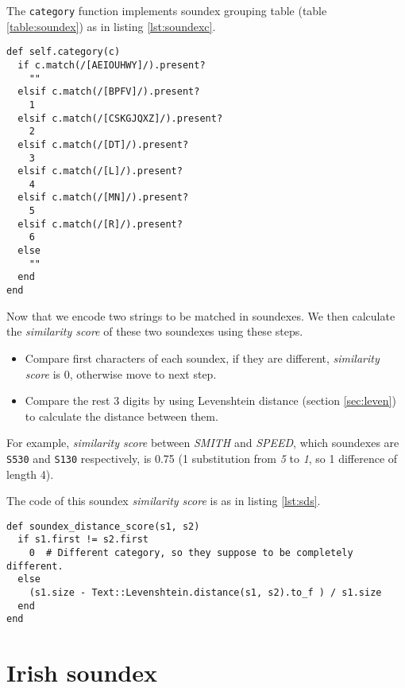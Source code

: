 The \texttt{category} function implements soundex grouping table (table \ref{table:soundex})
as in listing \ref{lst:soundexc}.

\begin{minipage}{\linewidth}
\begin{lstlisting}[label={lst:soundexc}, caption={Soundex grouping table implementation.}]
def self.category(c)
  if c.match(/[AEIOUHWY]/).present?
    ""
  elsif c.match(/[BPFV]/).present?
    1
  elsif c.match(/[CSKGJQXZ]/).present?
    2
  elsif c.match(/[DT]/).present?
    3
  elsif c.match(/[L]/).present?
    4
  elsif c.match(/[MN]/).present?
    5
  elsif c.match(/[R]/).present?
    6
  else
    ""
  end
end
\end{lstlisting}
\end{minipage}

Now that we encode two strings to be matched in soundexes.
We then calculate the \emph{similarity score} of these two soundexes using
these steps.

\begin{itemize}
  \item Compare first characters of each soundex, if they are different,
    \emph{similarity score} is 0, otherwise move to next step.
  \item Compare the rest 3 digits by using Levenshtein distance (section \ref{sec:leven})
    to calculate the distance between them.
\end{itemize}

For example, \emph{similarity score} between \emph{SMITH} and \emph{SPEED},
which soundexes are \texttt{S530} and \texttt{S130} respectively,
is 0.75 (1 substitution from \emph{5} to \emph{1}, so 1 difference of length 4).

The code of this soundex \emph{similarity score} is as in listing \ref{lst:sds}.

\begin{minipage}{\linewidth}
  \begin{lstlisting}[label={lst:sds}, caption={Soundex similarity score implementation.}]
def soundex_distance_score(s1, s2)
  if s1.first != s2.first
    0  # Different category, so they suppose to be completely different.
  else
    (s1.size - Text::Levenshtein.distance(s1, s2).to_f ) / s1.size
  end
end
\end{lstlisting}
\end{minipage}

\section{Irish soundex}

